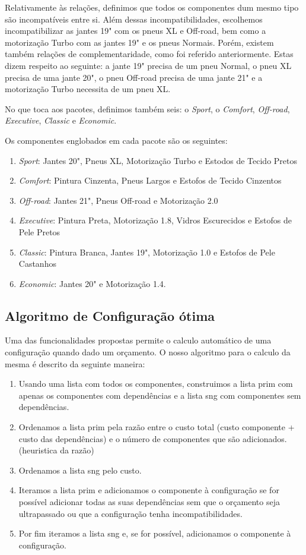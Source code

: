 Relativamente às relações, definimos que todos os componentes dum mesmo tipo são incompatíveis entre si. Além dessas incompatibilidades, escolhemos incompatibilizar as jantes 19" com os pneus XL e Off-road, bem como a motorização Turbo com as jantes 19" e os pneus Normais. Porém, existem também relações de complementaridade, como foi referido anteriormente. Estas dizem respeito ao seguinte: a jante 19" precisa de um pneu Normal, o pneu XL precisa de uma jante 20", o pneu Off-road precisa de uma jante 21" e a motorização Turbo necessita de um pneu XL.

No que toca aos pacotes, definimos também seis: o \textit{Sport}, o \textit{Comfort}, \textit{Off-road}, \textit{Executive}, \textit{Classic} e \textit{Economic}.

Os componentes englobados em cada pacote são os seguintes:
\begin{enumerate}
    \item \textit{Sport}: Jantes 20", Pneus XL, Motorização Turbo e Estodos de Tecido Pretos
    \item \textit{Comfort}: Pintura Cinzenta, Pneus Largos e Estofos de Tecido Cinzentos
    \item \textit{Off-road}: Jantes 21", Pneus Off-road e Motorização 2.0
    \item \textit{Executive}: Pintura Preta, Motorização 1.8, Vidros Escurecidos e Estofos de Pele Pretos
    \item \textit{Classic}: Pintura Branca, Jantes 19", Motorização 1.0 e Estofos de Pele Castanhos
    \item \textit{Economic}: Jantes 20" e Motorização 1.4.
\end{enumerate}


\subsection{Algoritmo de Configuração ótima}
Uma das funcionalidades propostas permite o calculo automático de uma configuração quando dado um orçamento. O nosso algoritmo para o calculo da mesma é descrito da seguinte maneira:
\begin{enumerate}
    \item Usando uma lista com todos os componentes, construimos a lista prim com apenas os componentes com dependências e a lista sng com componentes sem dependências.
    \item Ordenamos a lista prim pela razão entre o custo total (custo componente + custo das dependências) e o número de componentes que são adicionados. (heuristica da razão)
    \item Ordenamos a lista sng pelo custo.
    \item Iteramos a lista prim e adicionamos o componente à configuração se for possível adicionar todas as suas dependências sem que o orçamento seja ultrapassado ou que a configuração tenha incompatibilidades.
    \item Por fim iteramos a lista sng e, se for possível, adicionamos o componente à configuração.
\end{enumerate}

